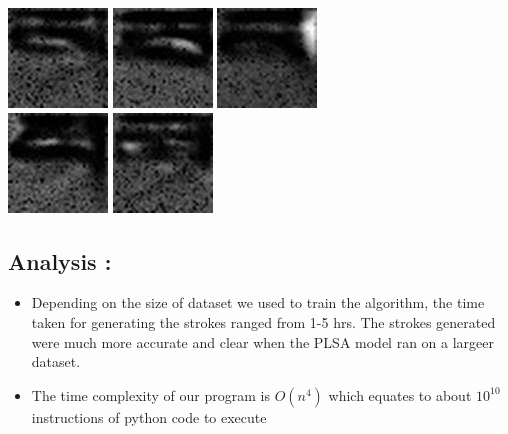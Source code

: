 \documentclass[10pt]{article}
\begin{document}
\begin{center}
				\includegraphics{stro5.jpg}
				\includegraphics{stro6.jpg}
				\includegraphics{stro7.jpg} \\
				\includegraphics{stro8.jpg}
				\includegraphics{stro9.jpg}
			\end{center}
		\subsection{Analysis :}
			\begin{itemize}
				\item 
				Depending on the size of dataset we used to train the algorithm, the time taken for generating the strokes ranged from 1-5 hrs. The strokes generated were much more accurate and clear when the PLSA model ran on a largeer dataset.
				\item
				The time complexity of our program is $O(n^4)$ which equates to about $10^{10}$ instructions of python code to execute
			\end{itemize}
	\newpage
\end{document}
